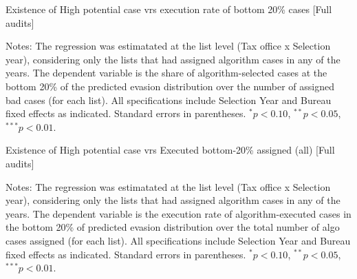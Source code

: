 \documentclass{article}
\newcommand{\OutPath}{Output/}%
\newcommand{\OutPath}{../Output/}%
\begin{document}
\begin{landscape}
\begin{table}[H]\centering
\begin{adjustbox}{max width=1.255\textwidth}
\begin{threeparttable}

\caption{Existence of High potential case vrs execution rate of bottom 20\% cases [Full audits]}
\label{tab:inspector_effort_disc_full}



\begin{tablenotes}[flushleft]
\footnotesize
\item Notes: The regression was estimatated at the list level (Tax office x Selection year), considering only the lists that had assigned algorithm cases in any of the years. The dependent variable is the share of algorithm-selected cases at the bottom 20\% of the predicted evasion distribution over the number of assigned bad cases (for each list). All specifications include Selection Year and Bureau fixed effects as indicated. Standard errors in parentheses. 
$^{*}p<0.10$, $^{**}p<0.05$, $^{***}p<0.01$.
\end{tablenotes}
\end{threeparttable}
\end{adjustbox}
\end{table}

\begin{table}[H]\centering
\begin{adjustbox}{max width=1.25\textwidth}
\begin{threeparttable}

\caption{Existence of High potential case vrs Executed bottom-20\% \/ assigned (all)  [Full audits]}
\label{tab:inspector_effort_disc_full}



\begin{tablenotes}[flushleft]
\footnotesize
\item Notes: The regression was estimatated at the list level (Tax office x Selection year), considering only the lists that had assigned algorithm cases in any of the years. The dependent variable is the execution rate of algorithm-executed cases in the bottom 20\% of predicted evasion distribution over the total number of algo cases assigned (for each list). All specifications include Selection Year and Bureau fixed effects as indicated. Standard errors in parentheses. 
$^{*}p<0.10$, $^{**}p<0.05$, $^{***}p<0.01$.
\end{tablenotes}
\end{threeparttable}
\end{adjustbox}
\end{table}



\end{landscape}
\end{document}
